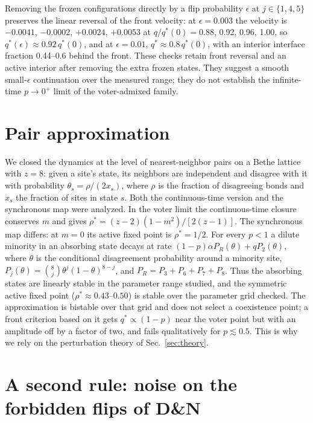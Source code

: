 \documentclass[pre,twocolumn,superscriptaddress,showpacs,floatfix]{revtex4-2}
\newcommand{\qs}{q^{*}}
\begin{document}
Removing the frozen configurations directly by a flip probability $\epsilon$ at
$j\in\{1,4,5\}$ preserves the linear reversal of the front velocity: at $\epsilon = 0.003$ the
velocity is $-0.0041$, $-0.0002$, $+0.0024$, $+0.0053$ at $q/\qs(0) = 0.88$, 0.92, 0.96, 1.00, so
$\qs(\epsilon)\approx 0.92\,\qs(0)$, and at $\epsilon = 0.01$, $\qs\approx 0.8\,\qs(0)$, with
an interior interface fraction 0.44--0.6 behind the front. These checks retain
front reversal and an active interior after removing the extra frozen states.
They suggest a smooth small-$\epsilon$ continuation over the measured range;
they do not establish the infinite-time $p\to0^+$ limit of the voter-admixed family.

\section{Pair approximation}
\label{app:pa}

We closed the dynamics at the level of nearest-neighbor pairs on a Bethe lattice with $z = 8$:
given a site's state, its neighbors are independent and disagree with it with probability
$\theta_s = \rho/(2x_s)$, where $\rho$ is the fraction of disagreeing bonds and $x_s$ the fraction
of sites in state $s$. Both the continuous-time version and the synchronous map were analyzed.
In the voter limit the continuous-time closure conserves $m$ and gives $\rho^*=(z-2)(1-m^2)/[2(z-1)]$. The synchronous map differs: at $m=0$ its active fixed point is $\rho^*=1/2$. For every
$p<1$ a dilute minority in an absorbing state decays at rate
$(1-p)\alpha P_R(\theta) + qP_2(\theta)$, where $\theta$ is the conditional
disagreement probability around a minority site,
$P_j(\theta)=\binom{8}{j}\theta^j(1-\theta)^{8-j}$, and
$P_R=P_3+P_6+P_7+P_8$. Thus the absorbing states are linearly stable in the
parameter range studied, and the
symmetric active fixed point ($\rho^*\approx 0.43$--$0.50$) is stable over the
parameter grid checked. The approximation is bistable over that grid and
does not select a coexistence point; a
front criterion based on it gets $\qs\propto(1-p)$ near the voter point but with an amplitude off
by a factor of two, and fails qualitatively for $p\lesssim 0.5$. This is why we rely on the
perturbation theory of Sec.~\ref{sec:theory}.

\section{A second rule: noise on the forbidden flips of D\&N}
\label{app:eta}
\end{document}
